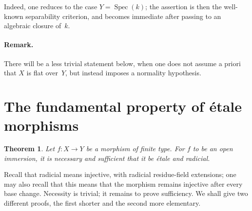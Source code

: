 \documentclass[11pt,oneside]{amsbook}
\newtheorem{theorem}[proposition]{Theorem}
\begin{document}
Indeed, one reduces to the case \(Y=\operatorname{Spec}(k)\); the assertion
is then the well-known separability criterion, and becomes immediate after
passing to an algebraic closure of~\(k\).

%
\paragraph{Remark.}
There will be a less trivial statement below, when one does not assume a
priori that \(X\) is flat over~\(Y\), but instead imposes a normality
hypothesis.


\section{The fundamental property of étale morphisms}
\label{I.5}

\begin{theorem}
\label{I.5.1}
Let \(f\colon X\to Y\) be a morphism of finite type.  For \(f\) to be an
open immersion, it is necessary and sufficient that it be
\emph{étale and radicial}.
\end{theorem}

Recall that radicial means injective, with radicial residue-field
extensions; one may also recall that this means that the morphism remains
injective after every base change.  Necessity is trivial; it remains to
prove sufficiency.  We shall give two different proofs, the first shorter
and the second more elementary.
\end{document}

